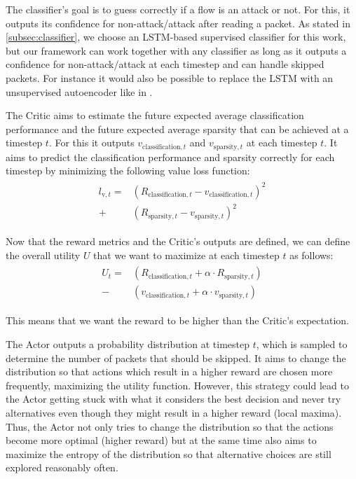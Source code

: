 \documentclass[conference]{IEEEtran}
\begin{document}
The classifier's goal is to guess correctly if a flow is an attack or not. For this, it outputs its confidence for non-attack/attack after reading a packet. As stated in \autoref{subsec:classifier}, we choose an LSTM-based supervised classifier for this work, but our framework can work together with any classifier as long as it outputs a confidence for non-attack/attack at each timestep and can handle skipped packets. For instance it would also be possible to replace the LSTM with an unsupervised autoencoder like in \cite{mirsky_kitsune_2018}.

The Critic aims to estimate the future expected average classification performance and the future expected average sparsity that can be achieved at a timestep $t$. For this it outputs $v_{\text{classification},t}$ and $v_{\text{sparsity},t}$ at each timestep $t$. It aims to predict the classification performance and sparsity correctly for each timestep by minimizing the following value loss function:
\begin{align}
\begin{split}
l_{\text{v},t} =& \left(R_{\text{classification},t} - v_{\text{classification},t}\right)^2 \\
+ & \left(R_{\text{sparsity},t} - v_{\text{sparsity},t}\right)^2
\end{split}
\end{align}

Now that the reward metrics and the Critic's outputs are defined, we can define the overall utility $U$ that we want to maximize at each timestep $t$ as follows:
\begin{align}
\begin{split}
U_t =& \left(R_{\text{classification},t} + \alpha \cdot R_{\text{sparsity},t}\right) \\
- & \left(v_{\text{classification},t} + \alpha \cdot v_{\text{sparsity},t}\right)
\end{split}
\end{align}

This means that we want the reward to be higher than the Critic's expectation.

The Actor outputs a probability distribution at timestep $t$, which is sampled to determine the number of packets that should be skipped. It aims to change the distribution so that actions which result in a higher reward are chosen more frequently, maximizing the utility function. However, this strategy could lead to the Actor getting stuck with what it considers the best decision and never try alternatives even though they might result in a higher reward (local maxima). Thus, the Actor not only tries to change the distribution so that the actions become more optimal (higher reward) but at the same time also aims to maximize the entropy of the distribution so that alternative choices are still explored reasonably often.
\end{document}
